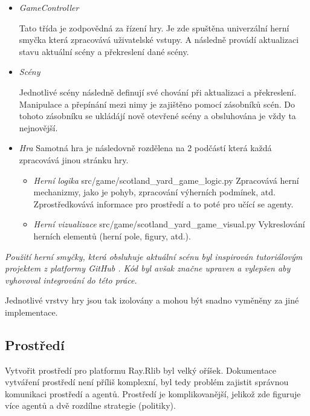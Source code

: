 \begin{itemize}
  \item \emph{GameController}~\cite{GameSceneController}
  
  Tato třída je zodpovědná za řízení hry.
  Je zde spuštěna univerzální herní smyčka která zpracovává uživatelské vstupy.
  A následně provádí aktualizaci stavu aktuální scény a překreslení dané scény.
  \item \emph{Scény}~\cite{GameSceneController}
  
  Jednotlivé scény následně definují své chování při aktualizaci a překreslení.
  Manipulace a přepínání mezi nimy je zajištěno pomocí zásobníků scén.
  Do tohoto zásobníku se ukládájí nově otevřené scény a obsluhována je vždy ta nejnovější.

  \item \emph{Hra}
    Samotná hra je následovně rozdělena na 2 podčástí která každá zpracovává jinou stránku hry.
    \begin{itemize}
      \item \emph{Herní logika} src/game/scotland\_yard\_game\_logic.py
      Zpracovává herní mechanizmy, jako je pohyb, zpracování výherních podmínek, atd.
      Zprostředkovává informace pro prostředí a to poté pro učící se agenty.

      \item \emph{Herní vizualizace}  src/game/scotland\_yard\_game\_visual.py
      Vykreslování herních elementů (herní pole, figury, atd.).
    \end{itemize}
\end{itemize}

\textit{Použití herní smyčky, která obsluhuje aktuální scénu byl inspirován tutoriálovým projektem z platformy GitHub \cite{GameSceneController}.
Kód byl avšak značne upraven a vylepšen aby vyhovoval integrování do této práce.}

Jednotlivé vrstvy hry jsou tak izolovány a mohou být snadno vyměněny za jiné implementace.

\subsection{Prostředí}\label{subsec:prostredi}
Vytvořit prostředí pro platformu Ray.Rlib byl velký oříšek.
Dokumentace vytváření prostředí není příliš komplexní, byl tedy problém zajistit správnou komunikaci prostředí a agentů.
Prostředí je komplikovanější, jelikož zde figuruje více agentů a dvě rozdílne strategie (politiky).

